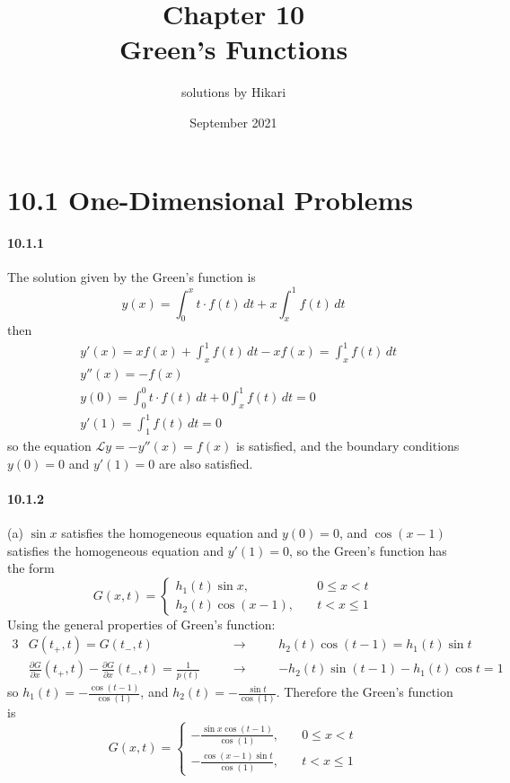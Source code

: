 \documentclass[a4paper]{article}
\title{Chapter 10\\Green’s Functions}
\author{solutions by Hikari}
\date{September 2021}
\begin{document}
\newcommand{\pdv}[2]{\frac{\partial#1}{\partial#2}}
\newcommand{\V}{\mathbf}
\newcommand{\br}[2]{\langle#1|#2\rangle}
\newcommand{\del}{\boldsymbol{\nabla}}

\maketitle

\section*{10.1 One-Dimensional Problems}

\paragraph{10.1.1}
The solution given by the Green's function is
\[
y(x)=\int_0^xt\cdot f(t)\,dt+x\int_x^1f(t)\,dt
\]
then
\begin{align*}
    & y'(x)=xf(x)+\int_x^1f(t)\,dt-xf(x)=\int_x^1f(t)\,dt\\
    & y''(x)=-f(x)\\
    & y(0)=\int_0^0t\cdot f(t)\,dt+0\int_x^1f(t)\,dt=0\\
    & y'(1)=\int_1^1f(t)\,dt=0
\end{align*}
so the equation $\mathcal{L}y=-y''(x)=f(x)$ is satisfied, and the boundary conditions $y(0)=0$ and $y'(1)=0$ are also satisfied.

\paragraph{10.1.2}
(a) $\sin x$ satisfies the homogeneous equation and $y(0)=0$, and $\cos(x-1)$ satisfies the homogeneous equation and $y'(1)=0$, so the Green's function has the form
\[
G(x,t)=
\begin{cases}
h_1(t)\sin x,\quad & 0\leq x<t\\
h_2(t)\cos(x-1),\quad & t<x\leq1
\end{cases}
\]
Using the general properties of Green's function:
\begin{alignat*}{3}
    & G(t_+,t)=G(t_-,t)\quad && \longrightarrow\quad && h_2(t)\cos(t-1)=h_1(t)\sin t\\
    & \pdv{G}{x}(t_+,t)-\pdv{G}{x}(t_-,t)=\frac{1}{p(t)}\quad && \longrightarrow\quad && -h_2(t)\sin(t-1)-h_1(t)\cos t=1
\end{alignat*}
so $h_1(t)=-\frac{\cos(t-1)}{\cos(1)}$, and $h_2(t)=-\frac{\sin t}{\cos(1)}$. Therefore the Green's function is
\[
G(x,t)=
\begin{cases}
-\frac{\sin x\cos(t-1)}{\cos(1)},\quad & 0\leq x<t\\[5pt]
-\frac{\cos(x-1)\sin t}{\cos(1)},\quad & t<x\leq1
\end{cases}
\]
\medskip
\end{document}
